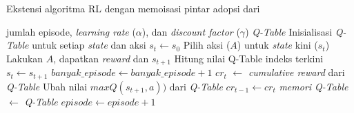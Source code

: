 \begin{algorithm}
	\makeatletter
	\renewcommand{\ALG@name}{Algoritma}
	\makeatother
	\caption{Ekstensi algoritma \ac{RL} dengan memoisasi pintar adopsi dari \parencite{mazaya2024reinforcement}}\label{alg:rl-qmemo}
	\renewcommand{\algorithmicrequire}{\textbf{Masukan:}}
	\renewcommand{\algorithmicensure}{\textbf{Keluaran:}}
	\begin{algorithmic}[1]
		\Require jumlah episode, \textit{learning rate} ($\alpha$), dan \textit{discount factor} ($\gamma$)
		\Ensure \textit{Q-Table}
		\State Inisialisasi \textit{Q-Table} untuk setiap \textit{state} dan aksi
		\State $s_{t} \gets s_0$
		\State Pilih aksi ($A$) untuk \textit{state} kini ($s_t$)
		\State Lakukan $A$, dapatkan \textit{reward} dan $s_{t+1}$
		\State Hitung nilai Q-Table indeks terkini 
		\State $s_t \gets s_{t+1}$
		\EndWhile
		\State $banyak\_episode \gets banyak\_episode + 1$
		\State $cr_t$ $\gets$ \textit{cumulative reward} dari \textit{Q-Table}
		\State Ubah nilai $maxQ(s_{t+1},a))$ dari \textit{Q-Table} \label{algline:q-memo-equation} 
		\EndIf
		\State $cr_{t-1} \gets cr_t$
		\State \textit{memori Q-Table} $\gets$ \textit{Q-Table}
		\State $episode \gets episode + 1$
		\EndWhile
	\end{algorithmic}
\end{algorithm}

